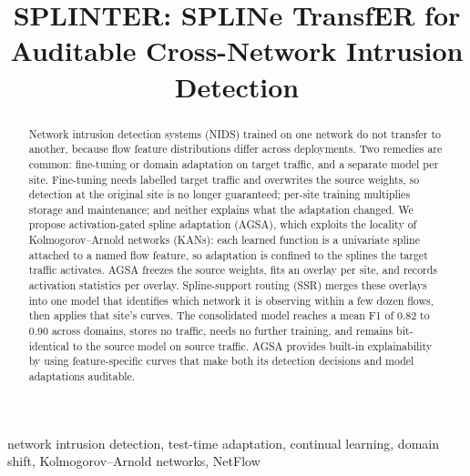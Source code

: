 \documentclass[10pt, conference, letterpaper]{IEEEtran}
\begin{document}
\title{SPLINTER: SPLINe TransfER for Auditable Cross-Network Intrusion Detection}

\author{
}

\maketitle

\begin{abstract}
Network intrusion detection systems (NIDS) trained on one network do not transfer to another, because flow feature distributions differ across deployments. Two remedies are common: fine-tuning or domain adaptation on target traffic, and a separate model per site. Fine-tuning needs labelled target traffic and overwrites the source weights, so detection at the original site is no longer guaranteed; per-site training multiplies storage and maintenance; and neither explains what the adaptation changed. We propose activation-gated spline adaptation (AGSA), which exploits the locality of Kolmogorov–Arnold networks (KANs): each learned function is a univariate spline attached to a named flow feature, so adaptation is confined to the splines the target traffic activates. AGSA freezes the source weights, fits an overlay per site, and records activation statistics per overlay. Spline-support routing (SSR) merges these overlays into one model that identifies which network it is observing within a few dozen flows, then applies that site's curves. The consolidated model reaches a mean F1 of 0.82 to 0.90 across domains, stores no traffic, needs no further training, and remains bit-identical to the source model on source traffic. AGSA provides built-in explainability by using feature-specific curves that make both its detection decisions and model adaptations auditable.
\end{abstract}

\begin{IEEEkeywords}
network intrusion detection, test-time adaptation, continual learning,
domain shift, Kolmogorov--Arnold networks, NetFlow
\end{IEEEkeywords}
\end{document}
